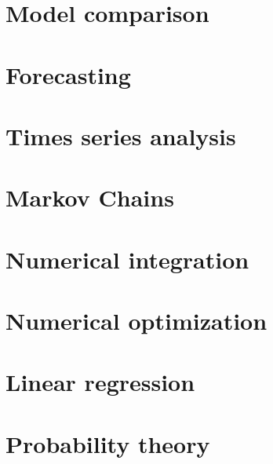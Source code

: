 \documentclass[12pt]{report}
\theoremstyle{definition}
\begin{document}
\chapter{Model comparison}
\label{chap:model-comparison}

\chapter{Forecasting}
\label{chap:forecasting}

\chapter{Times series analysis}
\label{chap:time-series-analysis}

\chapter{Markov Chains}
\label{chap:markov-chains}

\chapter{Numerical integration}
\label{chap:numerical-integration}

\chapter{Numerical optimization}
\label{chap:numerical-optmization}

\chapter{Linear regression}
\label{chap:linear-regression}

\appendix

\chapter{Probability theory}
\label{chap:probability-theory}

\end{document}
